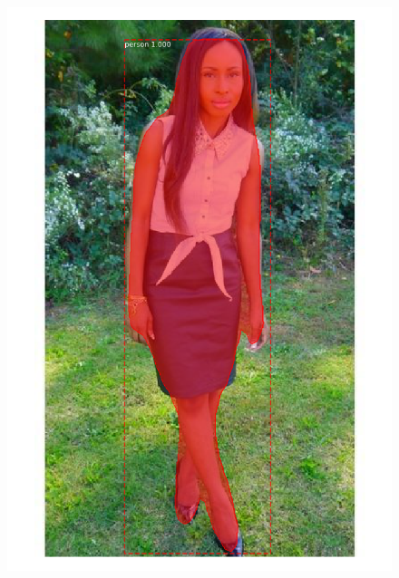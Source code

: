 \documentclass[12pt]{report}
\begin{document}
\begin{figure}
\begin{minipage}[b]{0.3\textwidth}
    \includegraphics[width=\textwidth]{images/resultados/1082993person.png}
  \end{minipage}
    \hfill
  \begin{minipage}[b]{0.3\textwidth}

\end{minipage}
\end{figure}
\end{document}
